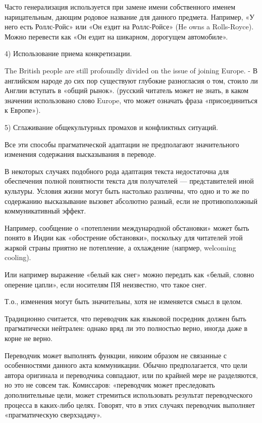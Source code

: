 Часто генерализация используется при замене имени собственного именем нарицательным, дающим родовое название для данного предмета. Например, «У него есть Роллс-Ройс» или «Он ездит на Роллс-Ройсе» (He owns a Rolls-Royce). Можно перевести как «Он ездит на шикарном, дорогущем автомобиле».

4) Использование приема конкретизации.

The British people are still profoundly divided on the issue of joining Europe. - В английском народе до сих пор существуют глубокие разногласия о том, стоило ли Англии вступать в «общий рынок». (русский читатель может не знать, в каком значении использовано слово Europe, что может означать фраза «присоединиться к Европе»).

5) Сглаживание общекультурных промахов и конфликтных ситуаций.

Все эти способы прагматической адаптации не предполагают значительного изменения содержания высказывания в переводе.

В некоторых случаях подобного рода адаптация текста недостаточна для обеспечения полной понятности текста для получателей --- представителей иной культуры. Условия жизни могут быть настолько различны, что одно и то же по содержанию высказывание вызовет абсолютно разный, если не противоположный коммуникативный эффект.

Например, сообщение о «потеплении международной обстановки» может быть понято в Индии как «обострение обстановки», поскольку для читателей этой жаркой страны приятно не потепление, а охлаждение (напрмер, welcoming cooling).

Или например выражение «белый как снег» можно передать как «белый, словно оперение цапли», если носителям ПЯ неизвестно, что такое снег.

Т.о., изменения могут быть значительны, хотя не изменяется смысл в целом.

Традиционно считается, что переводчик как языковой посредник должен быть прагматически нейтрален: однако вряд ли это полностью верно, иногда даже в корне не верно.

Переводчик может выполнять функции, никоим образом не связанные с особенностями данного акта коммуникации. Обычно предполагается, что цели автора оригинала и переводчика совпадают, или по крайней мере не разделяются, но это не совсем так.
Комиссаров: «переводчик может преследовать дополнительные цели, может стремиться использовать результат переводческого процесса в каких-либо целях. Говорят, что в
 этих случаях переводчик выполняет «прагматическую сверхзадачу».

